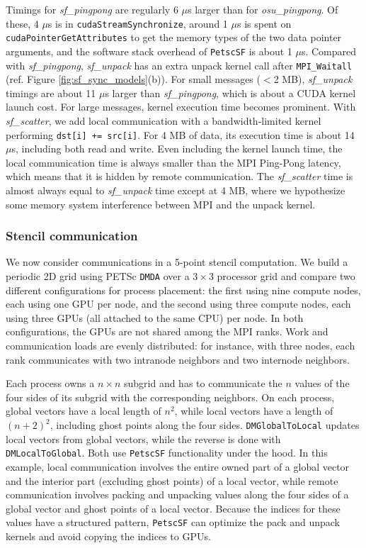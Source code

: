 \documentclass[5p,times]{elsarticle}
\begin{document}
Timings for \textit{sf\_pingpong} are regularly 6 $\mu$s larger than for \textit{osu\_pingpong}.
Of these, 4 $\mu$s is in \texttt{cudaStreamSynchronize}, around 1 $\mu$s is spent on  \texttt{cudaPointerGetAttributes}
to get the memory types of the two data pointer arguments,
and the software stack overhead of {\tt PetscSF} is about 1 $\mu$s.
Compared with
\textit{sf\_pingpong}, \textit{sf\_unpack} has an extra unpack kernel call after
\texttt{MPI\_Waitall} (ref. Figure \ref{fig:sf_sync_models}(b)). For small
messages ($<$2 MB), \textit{sf\_unpack} timings are about 11 $\mu$s larger than
\textit{sf\_pingpong}, which is about a CUDA kernel launch cost. For large
messages, kernel execution time becomes prominent.
With \textit{sf\_scatter}, we add local communication with a bandwidth-limited kernel performing
\texttt{dst[i] += src[i]}. For 4 MB of data, its
execution time is about 14 $\mu$s, including both
read and write. Even including the kernel launch time, the local communication
time is always smaller than the MPI Ping-Pong latency, which means that it is
hidden by remote communication. The
\textit{sf\_scatter} time is almost always equal to 
\textit{sf\_unpack} time except at 4 MB, where we hypothesize some memory system
interference between MPI and the unpack kernel.

\subsubsection{Stencil communication}
We now consider communications in a 5-point stencil computation. We build a periodic 2D grid
using PETSc \texttt{DMDA} over a $3\times3$ processor grid and compare two different configurations for process placement:
the first using nine compute nodes, each using one GPU per node, and the second using 
three compute nodes, each using three GPUs (all attached to the
same CPU) per node. In both configurations, the GPUs are not shared among the MPI ranks.
Work and communication loads are evenly distributed: for instance, with three nodes,
each rank communicates with two intranode neighbors and two
internode neighbors. 

Each process owns a $n\times n$ subgrid and has to communicate the
$n$ values of the four
sides of its subgrid with the corresponding neighbors.
On each
process, global vectors have a local length of $n^2$, while local vectors have a
length of $(n+2)^2$, including ghost points along the four sides.
\texttt{DMGlobalToLocal} updates local vectors from global vectors, while
the reverse is done with \texttt{DMLocalToGlobal}.  Both use \texttt{PetscSF} functionality under the hood.
In this example,
local communication involves the entire owned part of a
global vector and the interior part (excluding ghost points) of a local vector,
while remote communication involves packing and unpacking values along the four
sides of a global vector and ghost points of a local vector. Because the indices for these
values have a structured pattern, {\tt PetscSF} can optimize the pack and unpack kernels
and avoid copying the indices to GPUs.
\end{document}

